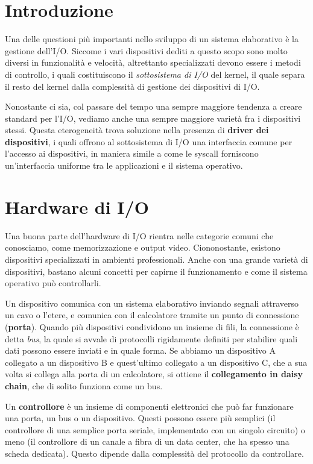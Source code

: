 \section{Introduzione}
    Una delle questioni più importanti nello sviluppo di un sistema elaborativo è la gestione dell'I/O. Siccome i vari dispositivi dediti a questo scopo sono molto diversi in funzionalità e velocità, altrettanto specializzati devono essere i metodi di controllo, i quali costituiscono il \textit{sottosistema di I/O} del kernel, il quale separa il resto del kernel dalla complessità di gestione dei dispositivi di I/O.
    
    Nonostante ci sia, col passare del tempo una sempre maggiore tendenza a creare standard per l'I/O, vediamo anche una sempre maggiore varietà fra i dispositivi stessi. Questa eterogeneità trova soluzione nella presenza di \textbf{driver dei dispositivi}, i quali offrono al sottosistema di I/O una interfaccia comune per l'accesso ai dispositivi, in maniera simile a come le syscall forniscono un'interfaccia uniforme tra le applicazioni e il sistema operativo.
    
\section{Hardware di I/O}
    Una buona parte dell'hardware di I/O rientra nelle categorie comuni che conosciamo, come memorizzazione e output video. Ciononostante, esistono dispositivi specializzati in ambienti professionali. Anche con una grande varietà di dispositivi, bastano alcuni concetti per capirne il funzionamento e come il sistema operativo può controllarli.
    
    Un dispositivo comunica con un sistema elaborativo inviando segnali attraverso un cavo o l'etere, e comunica con il calcolatore tramite un punto di connessione (\textbf{porta}). Quando più dispositivi condividono un insieme di fili, la connessione è detta \textit{bus}, la quale si avvale di protocolli rigidamente definiti per stabilire quali dati possono essere inviati e in quale forma. Se abbiamo un dispositivo A collegato a un dispositivo B e quest'ultimo collegato a un dispositivo C, che a sua volta si collega alla porta di un calcolatore, si ottiene il \textbf{collegamento in daisy chain}, che di solito funziona come un bus.
    
    Un \textbf{controllore} è un insieme di componenti elettronici che può far funzionare una porta, un bus o un dispositivo. Questi possono essere più semplici (il controllore di una semplice porta seriale, implementato con un singolo circuito) o meno (il controllore di un canale a fibra di un data center, che ha spesso una scheda dedicata). Questo dipende dalla complessità del protocollo da controllare.
    
